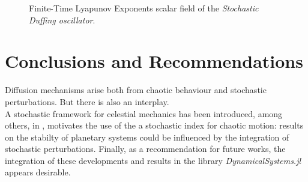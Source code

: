 \documentclass{juliacon}
\begin{document}
\begin{figure}[h]
    \centering
    \caption{Finite-Time Lyapunov Exponents scalar field of the \emph{Stochastic Duffing oscillator}.}
    \label{fig:duff}
\end{figure}

\section{Conclusions and Recommendations}
Diffusion mechanisms arise both from chaotic behaviour and stochastic perturbations. 
But there is also an interplay.\\
A stochastic framework for celestial mechanics has been introduced, among others, in \cite{manzibosch}, motivates the use of the a 
stochastic index for chaotic motion: results on the stabilty of planetary systems could be influenced by the integration of stochastic 
perturbations.
Finally, as a recommendation for future works, the integration of these developments and results in the library \textit{DynamicalSystems.jl} appears desirable.


\end{document}
